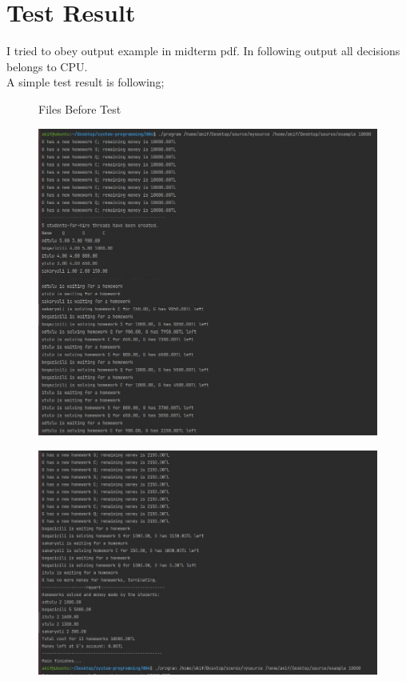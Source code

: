 \documentclass{article}
\begin{document}
\section{Test Result}
I tried to obey output example in midterm pdf. In following output all decisions belongs to CPU. \\
A simple test result is following; \\
\begin{figure}[H]
    \centering
    \qquad
    \caption{Files Before Test}
    \label{fig:example}
\end{figure}
\begin{figure}[H]
\includegraphics[width=1\textwidth, left]{res1.JPG}		
\end{figure}                              
\cleardoublepage
\begin{figure}[H]
\includegraphics[width=1\textwidth, left]{res2.JPG}
\caption[Optional caption]{}
\label{}		
\end{figure}    
\end{document}
